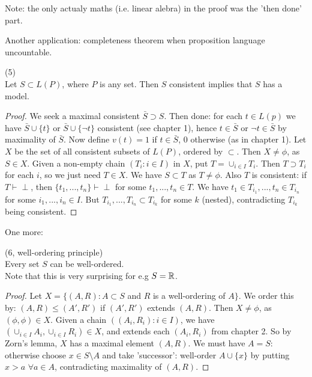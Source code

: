 \documentclass[a4paper]{article}
\begin{document}
Note: the only actualy maths (i.e. linear alebra) in the proof was the 'then done' part.

Another application: completeness theorem when proposition language uncountable.

\begin{thm} (5)\\
Let $S \subset L(P)$, where $P$ is any set. Then $S$ consistent implies that $S$ has a model.
\begin{proof}
We seek a maximal consistent $\bar{S} \supset S$. Then done: for each $t \in L(p)$ we have $\bar{S} \cup \{t\}$ or $\bar{S} \cup \{\neg t\}$ consistent (see chapter 1), hence $t \in \bar{S}$ or $\neg t \in \bar{S}$ by maximality of $\bar{S}$.  Now define $v(t) = 1$ if $t \in \bar{S}$, $0$ otherwise (as in chapter 1). Let $X$ be the set of all consistent subsets of $L(P)$, ordered by $\subset$. Then $X \neq \phi$, as $S \in X$. Given a non-empty chain $(T_i:i \in I)$ in $X$, put $T = \cup_{i \in I} T_i$. Then $T \supset T_i$ for each $i$, so we just need $T \in X$. We have $S \subset T$ as $T \neq \phi$. Also $T$ is consistent: if $T \vdash \perp$, then $\{t_1,...,t_n\} \vdash \perp$ for some $t_1,...,t_n \in T$. We have $t_1 \in T_{i_1},...,t_n \in T_{i_n}$ for some $i_1,...,i_n \in I$. But $T_{i_1},...,T_{i_n} \subset T_{i_k}$ for some $k$ (nested), contradicting $T_{i_k}$ being consistent.
\end{proof}
\end{thm}

One more:

\begin{thm} (6, well-ordering principle)\\
Every set $S$ can be well-ordered.\\
Note that this is very surprising for e.g $S=\mathbb{R}$.
\begin{proof}
Let $X = \{(A,R):A \subset S$ and $R$ is a well-ordering of $A\}$. We order this by: $(A,R) \leq (A',R')$ if $(A',R')$ extends $(A,R)$. Then $X \neq \phi$, as $(\phi,\phi) \in X$. Given a chain $((A_i,R_i) : i \in I)$, we have $(\cup_{i \in I} A_i, \cup_{i \in I} R_i) \in X$, and extends each $(A_i,R_i)$ from chapter 2. So by Zorn's lemma, $X$ has a maximal element $(A,R)$. We must have $A = S$: otherwise choose $x \in S\setminus A$ and take 'successor': well-order $A\cup\{x\}$ by putting $x > a$ $\forall a \in A$, contradicting maximality of $(A,R)$.
\end{proof}
\end{thm}
\end{document}
